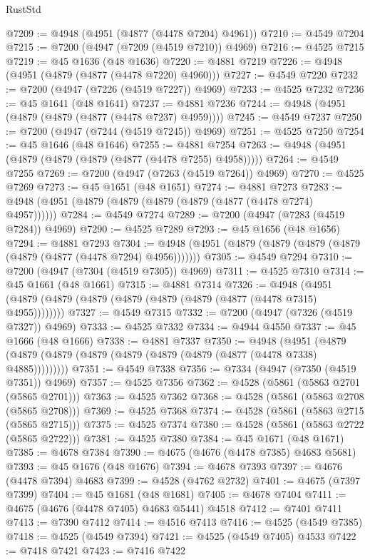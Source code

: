 \begin{lexlean}{RustStd}
\begin{coremodule}
{\begin{coremodule}
{{{{{{{{{{{{{{{{{{{{{{{{{{{{{{{{{{{{{{{{{{{{{{{{{{{{{{{{{{{{@7209 := @4948 (@4951 (@4877 (@4478 @7204) @4961))
@7210 := @4549 @7204
@7215 := @7200 (@4947 (@7209 (@4519 @7210)) @4969)
@7216 := @4525 @7215
@7219 := @45 @1636 (@48 @1636)
@7220 := @4881 @7219
@7226 := @4948 (@4951 (@4879 (@4877 (@4478 @7220) @4960)))
@7227 := @4549 @7220
@7232 := @7200 (@4947 (@7226 (@4519 @7227)) @4969)
@7233 := @4525 @7232
@7236 := @45 @1641 (@48 @1641)
@7237 := @4881 @7236
@7244 := @4948 (@4951 (@4879 (@4879 (@4877 (@4478 @7237) @4959))))
@7245 := @4549 @7237
@7250 := @7200 (@4947 (@7244 (@4519 @7245)) @4969)
@7251 := @4525 @7250
@7254 := @45 @1646 (@48 @1646)
@7255 := @4881 @7254
@7263 := @4948 (@4951 (@4879 (@4879 (@4879 (@4877 (@4478 @7255) @4958)))))
@7264 := @4549 @7255
@7269 := @7200 (@4947 (@7263 (@4519 @7264)) @4969)
@7270 := @4525 @7269
@7273 := @45 @1651 (@48 @1651)
@7274 := @4881 @7273
@7283 := @4948 (@4951 (@4879 (@4879 (@4879 (@4879 (@4877 (@4478 @7274) @4957))))))
@7284 := @4549 @7274
@7289 := @7200 (@4947 (@7283 (@4519 @7284)) @4969)
@7290 := @4525 @7289
@7293 := @45 @1656 (@48 @1656)
@7294 := @4881 @7293
@7304 := @4948 (@4951 (@4879 (@4879 (@4879 (@4879 (@4879 (@4877 (@4478 @7294) @4956)))))))
@7305 := @4549 @7294
@7310 := @7200 (@4947 (@7304 (@4519 @7305)) @4969)
@7311 := @4525 @7310
@7314 := @45 @1661 (@48 @1661)
@7315 := @4881 @7314
@7326 := @4948 (@4951 (@4879 (@4879 (@4879 (@4879 (@4879 (@4879 (@4877 (@4478 @7315) @4955))))))))
@7327 := @4549 @7315
@7332 := @7200 (@4947 (@7326 (@4519 @7327)) @4969)
@7333 := @4525 @7332
@7334 := @4944 @4550
@7337 := @45 @1666 (@48 @1666)
@7338 := @4881 @7337
@7350 := @4948
    (@4951 (@4879 (@4879 (@4879 (@4879 (@4879 (@4879 (@4879 (@4877 (@4478 @7338) @4885)))))))))
@7351 := @4549 @7338
@7356 := @7334 (@4947 (@7350 (@4519 @7351)) @4969)
@7357 := @4525 @7356
@7362 := @4528 (@5861 (@5863 @2701 (@5865 @2701)))
@7363 := @4525 @7362
@7368 := @4528 (@5861 (@5863 @2708 (@5865 @2708)))
@7369 := @4525 @7368
@7374 := @4528 (@5861 (@5863 @2715 (@5865 @2715)))
@7375 := @4525 @7374
@7380 := @4528 (@5861 (@5863 @2722 (@5865 @2722)))
@7381 := @4525 @7380
@7384 := @45 @1671 (@48 @1671)
@7385 := @4678 @7384
@7390 := @4675 (@4676 (@4478 @7385) @4683 @5681)
@7393 := @45 @1676 (@48 @1676)
@7394 := @4678 @7393
@7397 := @4676 (@4478 @7394) @4683
@7399 := @4528 (@4762 @2732)
@7401 := @4675 (@7397 @7399)
@7404 := @45 @1681 (@48 @1681)
@7405 := @4678 @7404
@7411 := @4675 (@4676 (@4478 @7405) @4683 @5441) @4518
@7412 := @7401 @7411
@7413 := @7390 @7412
@7414 := @4516 @7413
@7416 := @4525 (@4549 @7385)
@7418 := @4525 (@4549 @7394)
@7421 := @4525 (@4549 @7405) @4533
@7422 := @7418 @7421
@7423 := @7416 @7422
}}}}}}}}}}}}}}}}}}}}}}}}}}}}}}}}}}}}}}}}}}}}}}}}}}}}}}}}}}}}
\end{coremodule}}
\end{coremodule}
\end{lexlean}
